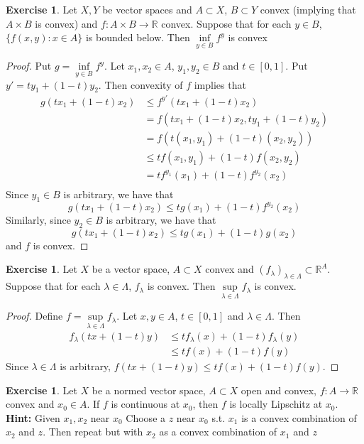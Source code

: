 \documentclass[12pt]{amsart}
\theoremstyle{definition}
\newtheorem{ex}[definition]{Exercise}
\newcommand{\lam}{\lambda}
\newcommand{\Lam}{\Lambda}
\newcommand{\R}{\mathbb{R}}
\begin{document}
	\begin{ex}
	Let $X, Y$ be vector spaces and $A \subset X$, $B \subset Y$ convex (implying that $A \times B$ is convex)  and $f:A \times B \rightarrow \R$ convex. Suppose that for each $y \in B$, $\{f(x, y): x \in A\}$ is bounded below. Then $\inf\limits_{y \in B}f^y$ is convex
	\end{ex}
	
	\begin{proof}
	Put $g = \inf\limits_{y \in B}f^y$. 
	Let $x_1, x_2 \in A$, $y_1, y_2 \in B$ and $t \in [0,1]$. Put $y'= ty_1 + (1-t)y_2$. Then convexity of $f$ implies that
	\begin{align*}
	g(tx_1 + (1-t)x_2) 
	& \leq f^{y'}(tx_1 + (1-t)x_2) \\
	&= f(tx_1 + (1-t)x_2, ty_1 + (1-t)y_2)\\
	&= f(t(x_1,y_1) + (1-t)(x_2, y_2)) \\
	& \leq tf(x_1, y_1) + (1-t)f(x_2, y_2) \\
	&= tf^{y_1}(x_1) + (1-t)f^{y_2}(x_2) \\
	\end{align*}
	Since $y_1 \in B$ is arbitrary, we have that $$g(tx_1 + (1-t)x_2) \leq tg(x_1) + (1-t)f^{y_2}(x_2)$$ Similarly, since $y_2 \in B$ is arbitrary, we have that $$g(tx_1 + (1-t)x_2) \leq tg(x_1) + (1-t)g(x_2)$$ and $f$ is convex.
	\end{proof}	

	\begin{ex}
	Let $X$ be a vector space, $A \subset X$ convex and $ (f_{\lam})_{\lam \in \Lam} \subset \R^A$. Suppose that for each $\lam \in \Lam$, $f_\lam$ is convex. Then $\sup\limits_{\lam \in \Lam}f_\lam$ is convex.
	\end{ex}
	
	\begin{proof}
	Define $f = \sup\limits_{\lam \in \Lam} f_{\lam}$. Let $x, y \in A$, $t \in [0,1]$ and $\lam \in \Lam$. Then \begin{align*}
	f_\lam(tx + (1-t)y) 
	&\leq tf_\lam (x) + (1-t)f_\lam(y) \\
	& \leq tf(x) + (1-t)f(y) 
\end{align*}	
	Since $\lam \in \Lam$ is arbitrary, $f(tx + (1-t)y) \leq tf(x) + (1-t)f(y) $. 
	\end{proof}
	
	\begin{ex}
	Let $X$ be a normed vector space, $A \subset X$ open and convex, $f:A \rightarrow \R$ convex and $x_0 \in A$. If $f$ is continuous at $x_0$, then $f$ is locally Lipschitz at $x_0$. \\
	\textbf{Hint:} Given $x_1, x_2$ near $x_0$ Choose a $z$ near $x_0$ s.t. $x_1$ is a convex combination of $x_2$ and $z$. Then repeat but with $x_2$ as a convex combination of $x_1$ and $z$
	\end{ex}
	
\end{document}
